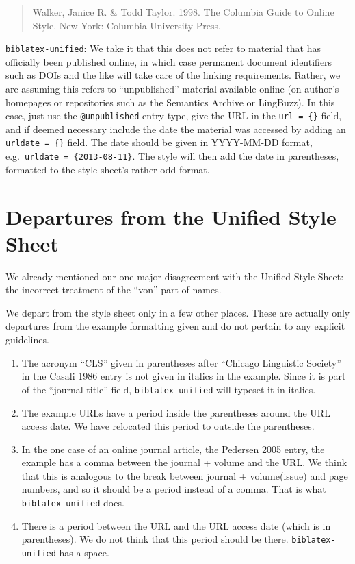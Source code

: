 \documentclass[
]{article}
\providecommand{\tightlist}{%
  \setlength{\itemsep}{0pt}\setlength{\parskip}{0pt}}
\begin{document}
\begin{quote}
Walker, Janice R. \& Todd Taylor. 1998. The Columbia Guide to Online
Style. New York: Columbia University Press.
\end{quote}

\texttt{biblatex-unified}: We take it that this does not refer to
material that has officially been published online, in which case
permanent document identifiers such as DOIs and the like will take care
of the linking requirements. Rather, we are assuming this refers to
``unpublished'' material available online (on author's homepages or
repositories such as the Semantics Archive or LingBuzz). In this case,
just use the \texttt{@unpublished} entry-type, give the URL in the
\texttt{url\ =\ \{\}} field, and if deemed necessary include the date
the material was accessed by adding an \texttt{urldate\ =\ \{\}} field.
The date should be given in YYYY-MM-DD format,
e.g.~\texttt{urldate\ =\ \{2013-08-11\}}. The style will then add the
date in parentheses, formatted to the style sheet's rather odd format.

\hypertarget{departures-from-the-unified-style-sheet}{%
\section{Departures from the Unified Style
Sheet}\label{departures-from-the-unified-style-sheet}}

We already mentioned our one major disagreement with the Unified Style
Sheet: the incorrect treatment of the ``von'' part of names.

We depart from the style sheet only in a few other places. These are
actually only departures from the example formatting given and do not
pertain to any explicit guidelines.

\begin{enumerate}
\def\labelenumi{\arabic{enumi}.}
\tightlist
\item
  The acronym ``CLS'' given in parentheses after ``Chicago Linguistic
  Society'' in the Casali 1986 entry is not given in italics in the
  example. Since it is part of the ``journal title'' field,
  \texttt{biblatex-unified} will typeset it in italics.
\item
  The example URLs have a period inside the parentheses around the URL
  access date. We have relocated this period to outside the parentheses.
\item
  In the one case of an online journal article, the Pedersen 2005 entry,
  the example has a comma between the journal + volume and the URL. We
  think that this is analogous to the break between journal +
  volume(issue) and page numbers, and so it should be a period instead
  of a comma. That is what \texttt{biblatex-unified} does.
\item
  There is a period between the URL and the URL access date (which is in
  parentheses). We do not think that this period should be there.
  \texttt{biblatex-unified} has a space.
\end{enumerate}
\end{document}
